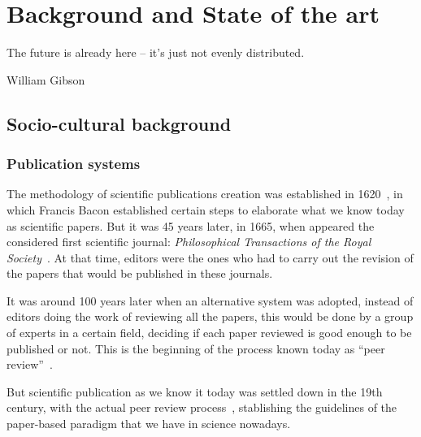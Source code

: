\chapter{Background and State of the art}

\begin{FraseCelebre}
  \begin{Frase}
    The future is already here – it's just not evenly distributed.
  \end{Frase}
  \begin{Fuente}
    William Gibson
  \end{Fuente}
\end{FraseCelebre}


\section{Socio-cultural background}
\label{scb}
\subsection{Publication systems}
\label{scb:ps}
The methodology of scientific publications creation was established in
1620~\cite{bacon1878novum}, in which Francis Bacon established certain steps to
elaborate what we know today as scientific papers. But it was 45 years later, in
1665, when appeared the considered first scientific journal: \emph{Philosophical
  Transactions of the Royal Society}~\cite{kronick1976history}. At that time,
editors were the ones who had to carry out the revision of the papers that would
be published in these journals.

It was around 100 years later when an alternative system was adopted, instead of
editors doing the work of reviewing all the papers, this would be done by a
group of experts in a certain field, deciding if each paper reviewed is good
enough to be published or not. This is the beginning of the process known today
as ``peer review''~\cite{spier2002history}.

But scientific publication as we know it today was settled down in the 19th
century, with the actual peer review process~\cite{burnham1990evolution},
stablishing the guidelines of the paper-based paradigm that we have in science
nowadays.

